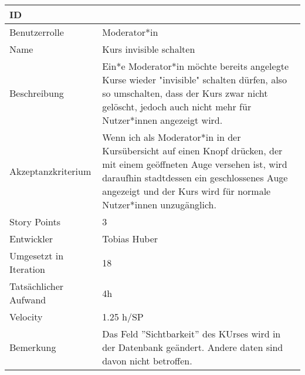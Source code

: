 \begin{tabularx}{\textwidth}{|p{}|X|}
	\hline
	ID & \\
	\hline
	Benutzerrolle & Moderator*in\\
	\hline
	Name & Kurs invisible schalten\\
	\hline
	Beschreibung & Ein*e Moderator*in möchte bereits angelegte Kurse wieder "invisible" schalten dürfen, also so umschalten, dass der Kurs zwar nicht gelöscht, jedoch auch nicht mehr für Nutzer*innen angezeigt wird.\\
	\hline
	Akzeptanzkriterium & Wenn ich als Moderator*in in der Kursübersicht auf einen Knopf drücken, der mit einem geöffneten Auge versehen ist, wird daraufhin stadtdessen ein geschlossenes Auge angezeigt und der Kurs wird für normale Nutzer*innen unzugänglich.\\
	\hline
	Story Points & 3\\
	\hline
	Entwickler & Tobias Huber\\
	\hline
	Umgesetzt in Iteration & 18\\
	\hline
	Tatsächlicher Aufwand & 4h\\
	\hline
	Velocity & 1.25 h/SP\\
	\hline
	Bemerkung & Das Feld ''Sichtbarkeit'' des KUrses wird in der Datenbank geändert. Andere daten sind davon nicht betroffen.\\
	\hline
\end{tabularx}
\vspace{20pt}
